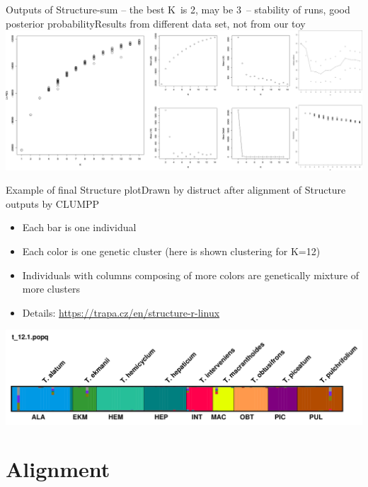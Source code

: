 \documentclass[compress, ucs, xelatex, 11pt, xcolor=svgnames,
  hyperref={
    bookmarks=true,
    unicode=true,
    colorlinks=true,
    pdftitle={Molecular data in R},
    plainpages=false,
    pdfauthor={Vojtech Zeisek},
    pdfsubject={Course about phylogeny and evolution in R},
    pdfcreator={XeLaTeX},
    pdfkeywords={R, evolution, phylogeny, molecular data},
    linkcolor=Tomato,
    anchorcolor=SaddleBrown,
    citecolor=Goldenrod,
    filecolor=DarkMagenta,
    menucolor=Sienna,
    urlcolor=DarkTurquoise,
    pdftex},
  url={hyphens, lowtilde} %
  ]{beamer}
\begin{document}
\begin{frame}{Outputs of Structure-sum -- the best K~is 2, may be 3~-- stability of runs, good posterior probability}{Results from different data set, not from our toy}
  \includegraphics[width=\textwidth]{structure.png}
\end{frame}

\begin{frame}{Example of final Structure plot}{Drawn by distruct after alignment of Structure outputs by CLUMPP}
  \begin{itemize}
    \item Each bar is one individual
    \item Each color is one genetic cluster (here is shown clustering for K=12)
    \item Individuals with columns composing of more colors are genetically mixture of more clusters
    \item Details: \url{https://trapa.cz/en/structure-r-linux}
  \end{itemize}
  \includegraphics[width=\textwidth]{structure-fin.png}
\end{frame}

\section{Alignment}
\end{document}
